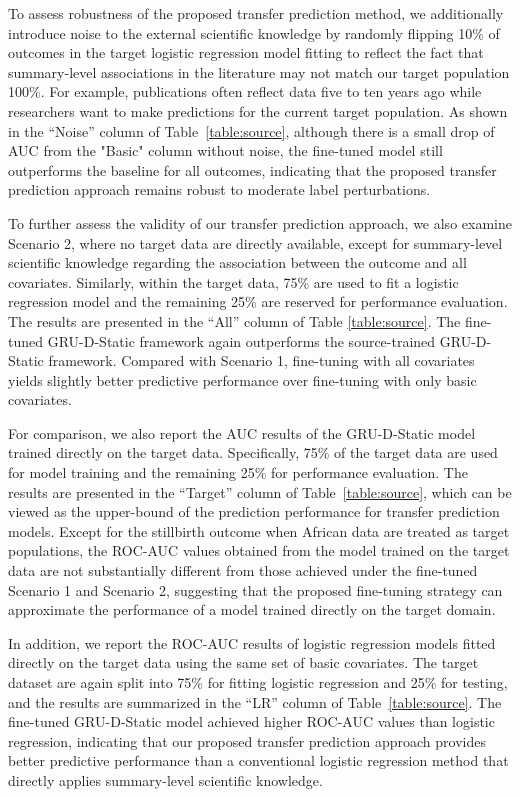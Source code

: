 \documentclass[fleqn,10pt]{wlscirep}
\begin{document}
To assess robustness of the proposed transfer prediction method, we additionally introduce noise to the external scientific knowledge by randomly flipping 10\% of outcomes in the target logistic regression model fitting to reflect the fact that summary-level associations in the literature may not match our target population 100\%. For example, publications often reflect data five to ten years ago while researchers want to make predictions for the current target population. As shown in the ``Noise'' column of Table~\ref{table:source}, although there is a small drop of AUC from the "Basic" column without noise, the fine-tuned model still outperforms the baseline for all outcomes, indicating that the proposed transfer prediction approach remains robust to moderate label perturbations.

To further assess the validity of our transfer prediction approach, we also examine Scenario 2, where no target data are directly available, except for summary-level scientific knowledge regarding the association between the outcome and all covariates. Similarly, within the target data, 75\% are used to fit a logistic regression model and the remaining 25\% are reserved for performance evaluation. The results are presented in the ``All'' column of Table \ref{table:source}. The fine-tuned GRU-D-Static framework again outperforms the source-trained GRU-D-Static framework. Compared with Scenario 1, fine-tuning with all covariates yields slightly better predictive performance over fine-tuning with only basic covariates. 

For comparison, we also report the AUC results of the GRU-D-Static model trained directly on the target data. Specifically, 75\% of the target data are used for model training and the remaining 25\% for performance evaluation. The results are presented in the ``Target'' column of Table~\ref{table:source}, which can be viewed as the upper-bound of the prediction performance for transfer prediction models. Except for the stillbirth outcome when African data are treated as target populations, the ROC-AUC values obtained from the model trained on the target data are not substantially different from those achieved under the fine-tuned Scenario 1 and Scenario 2, suggesting that the proposed fine-tuning strategy can approximate the performance of a model trained directly on the target domain.

In addition, we report the ROC-AUC results of logistic regression models fitted directly on the target data using the same set of basic covariates. The target dataset are again split into 75\% for fitting logistic regression and 25\% for testing, and the results are summarized in the ``LR'' column of Table~\ref{table:source}. The fine-tuned GRU-D-Static model achieved higher ROC-AUC values than logistic regression, indicating that our proposed transfer prediction approach provides better predictive performance than a conventional logistic regression method that directly applies summary-level scientific knowledge.
\end{document}
